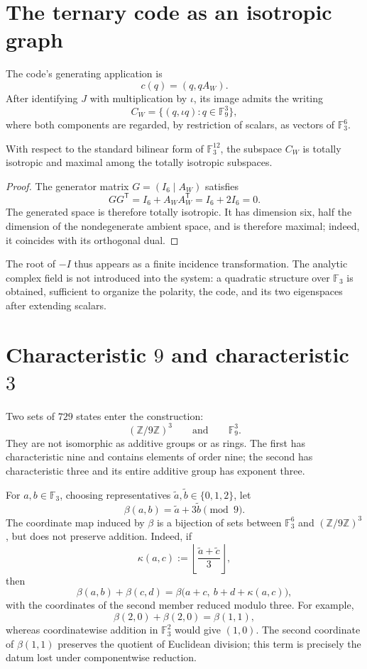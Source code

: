 \section{The ternary code as an isotropic graph}

The code's generating application is
\[
 c(q)=(q,qA_W).
\]
After identifying \(J\) with multiplication by \(\iota\), its image
admits the writing
\[
 C_W=\{(q,\iota q):q\in\mathbb F_9^3\},
\]
where both components are regarded, by restriction of scalars, as
vectors of \(\mathbb F_3^6\).

\begin{proposition}
\label{prop:golay-grafo-isotropico}
With respect to the standard bilinear form of \(\mathbb F_3^{12}\), the
subspace \(C_W\) is totally isotropic and maximal among the totally
isotropic subspaces.
\end{proposition}

\begin{proof}
The generator matrix \(G=(I_6\mid A_W)\) satisfies
\[
 GG^{\mathsf T}=I_6+A_WA_W^{\mathsf T}=I_6+2I_6=0.
\]
The generated space is therefore totally isotropic. It has
dimension six, half the dimension of the nondegenerate ambient space,
and is therefore maximal; indeed, it coincides with its orthogonal dual.
\end{proof}

The root of \(-I\) thus appears as a finite incidence transformation.
The analytic complex field is not introduced into the system: a
quadratic structure over \(\mathbb F_3\) is obtained, sufficient to organize the
polarity, the code, and its two eigenspaces after extending
scalars.

\section{Characteristic \(9\) and characteristic \(3\)}

Two sets of \(729\) states enter the construction:
\[
 (\mathbb Z/9\mathbb Z)^3
 \qquad\text{and}\qquad
 \mathbb F_9^3.
\]
They are not isomorphic as additive groups or as rings. The first has
characteristic nine and contains elements of order nine; the second has
characteristic three and its entire additive group has exponent three.

For \(a,b\in\mathbb F_3\), choosing representatives
\(\widetilde a,\widetilde b\in\{0,1,2\}\), let
\[
 \beta(a,b)=\widetilde a+3\widetilde b\pmod 9.
\]
The coordinate map induced by \(\beta\) is a bijection of sets between \(\mathbb F_3^6\) and \((\mathbb Z/9\mathbb Z)^3\), but does not preserve addition. Indeed, if
\[
 \kappa(a,c)
 :=\left\lfloor
 \frac{\widetilde a+\widetilde c}{3}
 \right\rfloor,
\]
then
\[
 \beta(a,b)+\beta(c,d)
 =\beta\bigl(a+c,\ b+d+\kappa(a,c)\bigr),
\]
with the coordinates of the second member reduced modulo three. For example,
\[
 \beta(2,0)+\beta(2,0)=\beta(1,1),
\]
whereas coordinatewise addition in \(\mathbb F_3^2\) would give \((1,0)\). The
second coordinate of \(\beta(1,1)\) preserves the quotient of Euclidean
division; this term is precisely the datum lost under
componentwise reduction.

